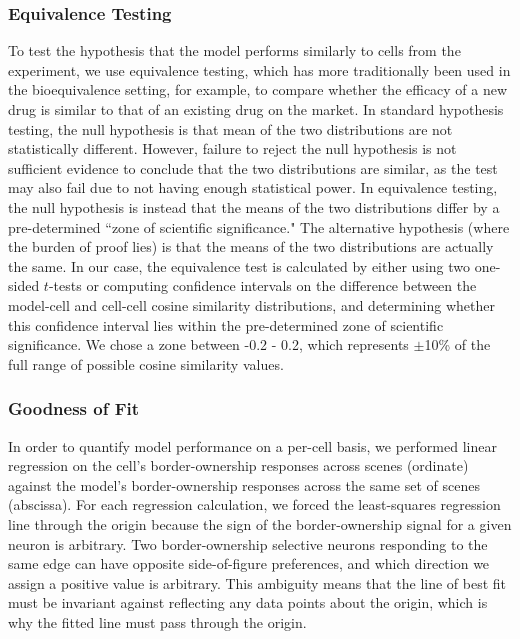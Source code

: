 \documentclass[12pt]{article}
\begin{document}
\subsubsection{Equivalence Testing}
To test the hypothesis that the model performs similarly to cells from the experiment, we use equivalence testing, which has more traditionally been used in the bioequivalence setting, for example, to compare whether the efficacy of a new drug is similar to that of an existing drug on the market. In standard hypothesis testing, the null hypothesis is that mean of the two distributions are not statistically different. However, failure to reject the null hypothesis is not sufficient evidence to conclude that the two distributions are similar, as the test may also fail due to not having enough statistical power. In equivalence testing, the null hypothesis is instead that the means of the two distributions differ by a pre-determined ``zone of scientific significance." The alternative hypothesis (where the burden of proof lies) is that the means of the two distributions are actually the same. In our case, the equivalence test is calculated by either using two one-sided $t$-tests or computing confidence intervals on the difference between the model-cell and cell-cell cosine similarity distributions, and determining whether this confidence interval lies within the pre-determined zone of scientific significance. We chose a zone between -0.2 - 0.2, which represents $\pm$10\% of the full range of possible cosine similarity values.

\subsubsection{Goodness of Fit}
In order to quantify model performance on a per-cell basis, we performed linear regression on the cell's border-ownership responses across scenes (ordinate) against the model's border-ownership responses across the same set of scenes (abscissa). For each regression calculation, we forced the least-squares regression line through the origin because the sign of the border-ownership signal for a given neuron is arbitrary. Two border-ownership selective neurons responding to the same edge can have opposite side-of-figure preferences, and which direction we assign a positive value is arbitrary. This ambiguity means that the line of best fit must be invariant against reflecting any data points about the origin, which is why the fitted line must pass through the origin.
\end{document}
